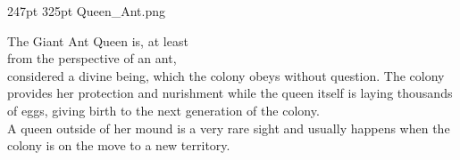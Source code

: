 \def\primarycolor{titlered}%
\def\secondarycolor{white}%
\MonsterBannerGraphic%
	{}%
	{247pt}%
	{325pt}%
	{Queen_Ant.png}%
	{}%
%
	
\noindent The Giant Ant Queen is, at least\\
from the perspective of an ant,\\
considered a divine being, which the colony obeys without question. The colony provides her protection and nurishment while the queen itself is laying thousands of eggs, giving birth to the next generation of the colony.\\
A queen outside of her mound is a very rare sight and usually happens when the colony is on the move to a new territory.


